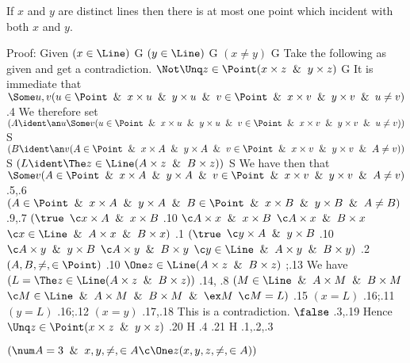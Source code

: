 If $x$ and $y$ are distinct lines then there is at most one point which 
incident with both $x$ and $y$.

\vfil
\eject

\lineb Proof:  Given
	 $(x \in \Line)$ \By G
	 $(y \in \Line)$ \By G
	 $(x \ne y)$ \By  G
\lineb Take the following as given and get a contradiction.
	 $\Not\Unq z \in \Point (x \times z \And y \times z)$  \By G
\lineb It is immediate that
	 $\Some u ,v (u \in \Point \And x \times u \And y \times u \And
v \in \Point \And x \times v \And y \times v \And u \ne v)$ \By .4
\lineb We therefore set
	 $(A \ident \an u \Some v(u \in \Point \And x \times u \And
  y \times u \And v \in \Point \And x \times v \And y \times v \And u \ne v))$ \By S 
	 $(B \ident  \an v(A \in \Point \And x \times A \And 
 y \times A \And v \in \Point \And x \times v \And y \times v \And A \ne v))$ \By S 
	 $(L \ident \The z \in \Line(A \times z \And B \times z))$ \By S 
\lineb We have then that
	 $\Some v(A \in \Point \And x \times A \And 
 y \times A \And v \in \Point \And x \times v \And y \times v \And A \ne v)$ \By .5,.6 
  $(A \in \Point \And x \times A \And 
 y \times A \And B \in \Point \And x \times B \And y \times B \And A \ne B)$ \By .9,.7 
  $(\true$
 \linec $\c x \times A \And x \times B$ \By .10
 \linec $\c A \times x \And x \times B$ 
 \linec $\c A \times x \And B\times x $ 
 \linec $\c x \in \Line \And A\times x \And B \times x)$ \By .1
  $(\true$
 \linec $\c y  \times A \And y \times B$ \By .10
 \linec $\c A \times y \And y \times B$ 
 \linec $\c A\times y \And B\times y$ 
 \linec $\c y \in \Line \And A\times y \And B \times y)$ \By .2
  $(A,B,\ne,\in\Point)$ \By .10
  $\One z \in \Line(A \times z \And B \times z)$ ;.13
\lineb We have
  $(L = \The z \in \Line(A \times z \And B \times z))$ \By  .14, .8
  $(M \in \Line \And A\times M \And B\times M$
\linec $\c M \in \Line \And A\times M \And B\times M \And \ex M$ 
\linec $\c M=L)$ \By .15
  $(x = L)$ \By .16;.11
  $(y = L)$ \By .16;.12
  $(x = y)$ \By .17,.18
	\lineb This is a contradiction.
  $\false$ \By .3,.19
	\lineb Hence
  $ \Unq z \in \Point (x \times z \And y \times z)$  \By .20 H .4 
\lineb \Bye .21 H .1,.2,.3
\lineb


\vfil
\eject




 $(\num A = 3 \And x,y,\ne,\in A \c \One z(x,y,z,\ne,\in A))$

